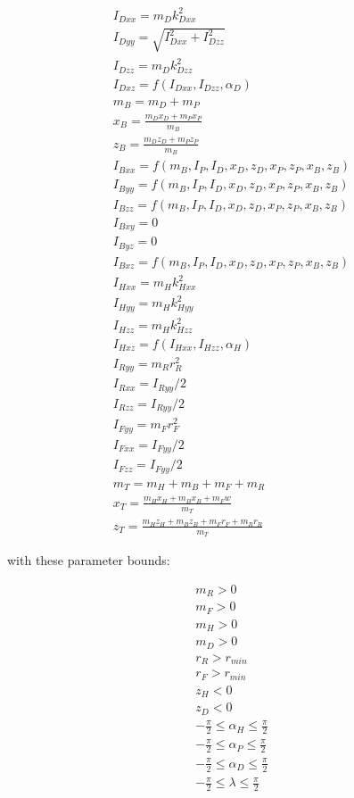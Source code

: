 \documentclass{article}
\begin{document}
\begin{align}
  I_{Dxx} = m_D k_{Dxx}^2 \\
  I_{Dyy} = \sqrt{I_{Dxx}^2 + I_{Dzz}^2} \\
  I_{Dzz} = m_D k_{Dzz}^2 \\
  I_{Dxz} = f(I_{Dxx}, I_{Dzz}, \alpha_D)  \\
  m_B = m_D + m_P \\
  x_B = \frac{m_D x_D + m_P x_P}{m_B} \\
  z_B = \frac{m_D z_D + m_P z_P}{m_B} \\
  I_{Bxx} = f(m_B, I_P, I_D, x_D, z_D, x_P, z_P, x_B, z_B) \\
  I_{Byy} = f(m_B, I_P, I_D, x_D, z_D, x_P, z_P, x_B, z_B) \\
  I_{Bzz} = f(m_B, I_P, I_D, x_D, z_D, x_P, z_P, x_B, z_B) \\
  I_{Bxy} = 0 \\
  I_{Byz} = 0 \\
  I_{Bxz} = f(m_B, I_P, I_D, x_D, z_D, x_P, z_P, x_B, z_B) \\
  I_{Hxx} = m_H k_{Hxx}^2 \\
  I_{Hyy} = m_H k_{Hyy}^2\\
  I_{Hzz} = m_H k_{Hzz}^2 \\
  I_{Hxz} = f(I_{Hxx}, I_{Hzz}, \alpha_H)  \\
  I_{Ryy} = m_R r_R^2 \\
  I_{Rxx} = I_{Ryy} / 2 \\
  I_{Rzz} = I_{Ryy} / 2 \\
  I_{Fyy} = m_F r_F^2 \\
  I_{Fxx} = I_{Fyy} / 2 \\
  I_{Fzz} = I_{Fyy} / 2 \\
  m_T = m_H + m_B + m_F + m_R \\
  x_T = \frac{m_H x_H + m_B x_B + m_F w}{m_T} \\
  z_T = \frac{m_H z_H + m_B z_B + m_F r_F + m_R r_R}{m_T} 
\end{align}

with these parameter bounds:

\begin{align}
  m_R > 0 \\
  m_F > 0 \\
  m_H > 0 \\
  m_D > 0 \\
  r_R > r_{min} \\
  r_F > r_{min} \\
  z_H < 0 \\
  z_D < 0 \\
  -\frac{\pi}{2} \leq \alpha_H \leq \frac{\pi}{2} \\
  -\frac{\pi}{2} \leq \alpha_P \leq \frac{\pi}{2} \\
  -\frac{\pi}{2} \leq \alpha_D \leq \frac{\pi}{2} \\
  -\frac{\pi}{2} \leq \lambda \leq \frac{\pi}{2}
\end{align}
\end{document}
